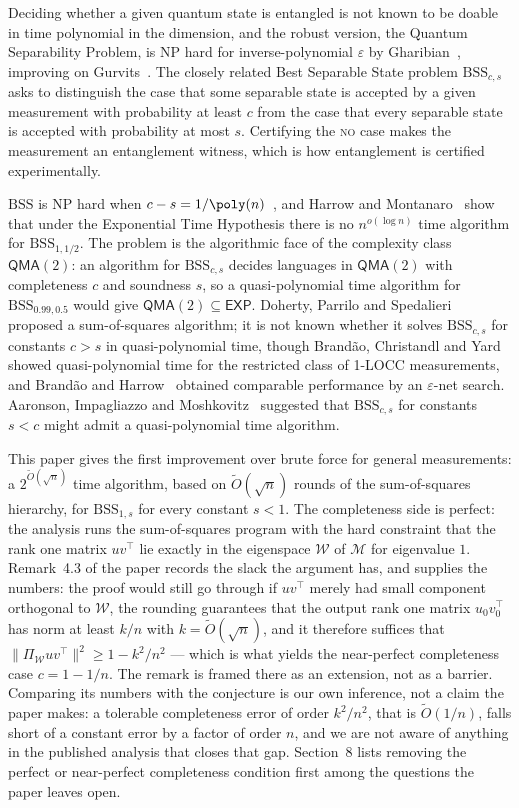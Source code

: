 \documentclass{conjura-conjecture}
\newcommand{\BSS}{\mathrm{BSS}}
\newcommand{\tO}{\tilde{O}}
\newcommand{\QMA}{\mathsf{QMA}}
\newcommand{\EXP}{\mathsf{EXP}}
\begin{document}
Deciding whether a given quantum state is entangled is not known to be
doable in time polynomial in the dimension, and the robust version, the
Quantum Separability Problem, is NP hard for inverse-polynomial
$\varepsilon$ by Gharibian~\cite{Gha10}, improving on
Gurvits~\cite{Gur03}. The closely related Best Separable State problem
$\BSS_{c,s}$ asks to distinguish the case that some separable state is
accepted by a given measurement with probability at least $c$ from the
case that every separable state is accepted with probability at most
$s$. Certifying the \textsc{no} case makes the measurement an
entanglement witness, which is how entanglement is certified
experimentally.

$\BSS$ is NP hard when $c - s = 1/\poly(n)$~\cite{BT09,Gur03}, and
Harrow and Montanaro~\cite{HM13} show that under the Exponential Time
Hypothesis there is no $n^{o(\log n)}$ time algorithm for
$\BSS_{1,1/2}$. The problem is the algorithmic face of the complexity
class $\QMA(2)$: an algorithm for $\BSS_{c,s}$ decides languages in
$\QMA(2)$ with completeness $c$ and soundness $s$, so a
quasi-polynomial time algorithm for $\BSS_{0.99,0.5}$ would give
$\QMA(2) \subseteq \EXP$. Doherty, Parrilo and
Spedalieri~\cite{DPS04} proposed a sum-of-squares algorithm; it is not
known whether it solves $\BSS_{c,s}$ for constants $c > s$ in
quasi-polynomial time, though Brand\~{a}o, Christandl and
Yard~\cite{BaCY11} showed quasi-polynomial time for the restricted class
of 1-LOCC measurements, and Brand\~{a}o and Harrow~\cite{BH15} obtained
comparable performance by an $\varepsilon$-net search. Aaronson,
Impagliazzo and Moshkovitz~\cite{AIM14} suggested that $\BSS_{c,s}$ for
constants $s < c$ might admit a quasi-polynomial time algorithm.

This paper gives the first improvement over brute force for general
measurements: a $2^{\tO(\sqrt{n})}$ time algorithm, based on
$\tO(\sqrt{n})$ rounds of the sum-of-squares hierarchy, for
$\BSS_{1,s}$ for every constant $s < 1$. The completeness side is
perfect: the analysis runs the sum-of-squares program with the hard
constraint that the rank one matrix $uv^{\top}$ lie exactly in the
eigenspace $\mathcal{W}$ of $\mathcal{M}$ for eigenvalue $1$. Remark~4.3
of the paper records the slack the argument has, and supplies the
numbers: the proof would still go through if $uv^{\top}$ merely had
small component orthogonal to $\mathcal{W}$, the rounding guarantees
that the output rank one matrix $u_{0} v_{0}^{\top}$ has norm at least
$k/n$ with $k = \tO(\sqrt{n})$, and it therefore suffices that
$\|\Pi_{\mathcal{W}} uv^{\top}\|^{2} \ge 1 - k^{2}/n^{2}$ --- which is
what yields the near-perfect completeness case $c = 1 - 1/n$. The
remark is framed there as an extension, not as a barrier. Comparing its
numbers with the conjecture is our own inference, not a claim the paper
makes: a tolerable completeness error of order $k^{2}/n^{2}$, that is
$\tO(1/n)$, falls short of a constant error by a factor of order $n$,
and we are not aware of anything in the published analysis that closes
that gap. Section~8 lists removing the perfect or near-perfect
completeness condition first among the questions the paper leaves open.
\end{document}

